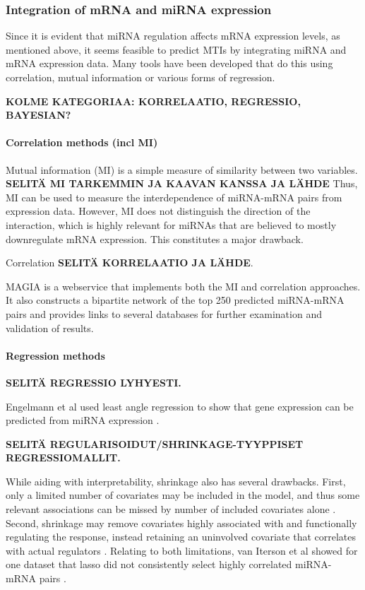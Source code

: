 \subsubsection{Integration of mRNA and miRNA expression}

Since it is evident that miRNA regulation affects mRNA expression levels, as
mentioned above, it seems feasible to predict MTIs by integrating miRNA and
mRNA expression data. Many tools have been developed that do this using
correlation, mutual information or various forms of regression.

\textbf{KOLME KATEGORIAA: KORRELAATIO, REGRESSIO, BAYESIAN?}

\paragraph{Correlation methods (incl MI)}\label{correlation-methods}

Mutual information (MI) is a simple measure of similarity between two
variables. \textbf{SELITÄ MI TARKEMMIN JA KAAVAN KANSSA JA LÄHDE} Thus, MI can
be used to measure the interdependence of miRNA-mRNA pairs from expression
data. However, MI does not distinguish the direction of the interaction, which
is highly relevant for miRNAs that are believed to mostly downregulate mRNA
expression. This constitutes a major drawback.

Correlation \textbf{SELITÄ KORRELAATIO JA LÄHDE}.

MAGIA \citep{Sales2010} is a webservice that implements both the MI and
correlation approaches. It also constructs a bipartite network of the top 250
predicted miRNA-mRNA pairs and provides links to several databases for further
examination and validation of results.



\paragraph{Regression methods}\label{regression-methods}

\textbf{SELITÄ REGRESSIO LYHYESTI.}

Engelmann et al used least angle regression to show that gene expression can
be predicted from miRNA expression \citep{Engelmann}.

\textbf{SELITÄ REGULARISOIDUT/SHRINKAGE-TYYPPISET REGRESSIOMALLIT.}

While aiding with interpretability, shrinkage also has several drawbacks.
First, only a limited number of covariates may be included in the model, and
thus some relevant associations can be missed by number of included covariates
alone \citep{vanIterson2013}. Second, shrinkage may remove covariates highly
associated with and functionally regulating the response, instead retaining an
uninvolved covariate that correlates with actual regulators \citep{Engelmann}.
Relating to both limitations, van Iterson et al showed for one dataset that
lasso did not consistently select highly correlated miRNA-mRNA pairs
\citep{vanIterson2013}.

